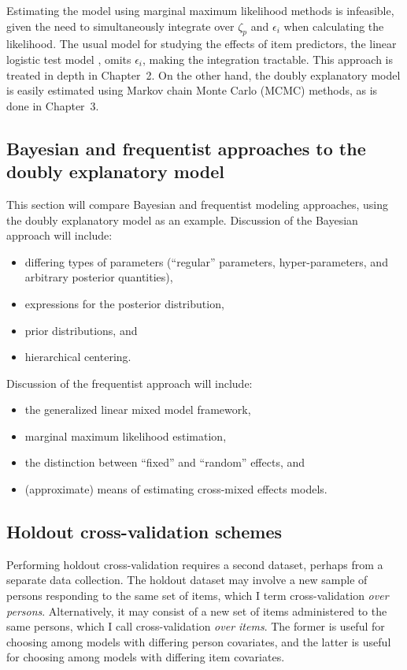 \documentclass[letterpaper]{article}
\begin{document}
Estimating the model using marginal maximum likelihood methods is infeasible, given the need to simultaneously integrate over $\zeta_p$ and $\epsilon_i$ when calculating the likelihood. The usual model for studying the effects of item predictors, the linear logistic test model \cite{Fischer1973}, omits $\epsilon_i$, making the integration tractable. This approach is treated in depth in Chapter~2. On the other hand, the doubly explanatory model is easily estimated using Markov chain Monte Carlo (MCMC) methods, as is done in Chapter~3.


\subsection{Bayesian and frequentist approaches to the doubly explanatory model}

This section will compare Bayesian and frequentist modeling approaches, using the doubly explanatory model as an example. Discussion of the Bayesian approach will include:
\begin{itemize}
	\item differing types of parameters (``regular'' parameters, hyper-parameters, and arbitrary posterior quantities), 
	\item expressions for the posterior distribution, 
	\item prior distributions, and 
	\item hierarchical centering. 
\end{itemize}
Discussion of the frequentist approach will include:
\begin{itemize}
	\item the generalized linear mixed model framework,
	\item marginal maximum likelihood estimation,
	\item the distinction between ``fixed'' and ``random'' effects, and
	\item (approximate) means of estimating cross-mixed effects models.
\end{itemize}


\subsection{Holdout cross-validation schemes}

Performing holdout cross-validation requires a second dataset, perhaps from a separate data collection. The holdout dataset may involve a new sample of persons responding to the same set of items, which I term cross-validation \emph{over persons}. Alternatively, it may consist of a new set of items administered to the same persons, which I call cross-validation \emph{over items}. The former is useful for choosing among models with differing person covariates, and the latter is useful for choosing among models with differing item covariates.
\end{document}
